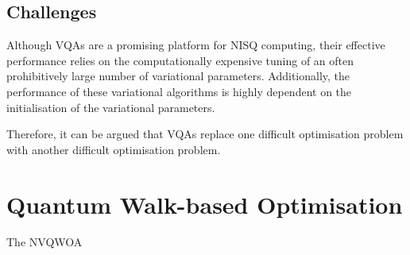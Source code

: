 \subsection{Challenges}
Although VQAs are a promising platform for NISQ computing, their effective performance relies on the computationally expensive tuning of an often prohibitively large number of variational parameters. Additionally, the performance of these variational algorithms is highly dependent on the initialisation of the variational parameters. 

Therefore, it can be argued that VQAs replace one difficult optimisation problem with another difficult optimisation problem.

\section{Quantum Walk-based Optimisation}
The NVQWOA 